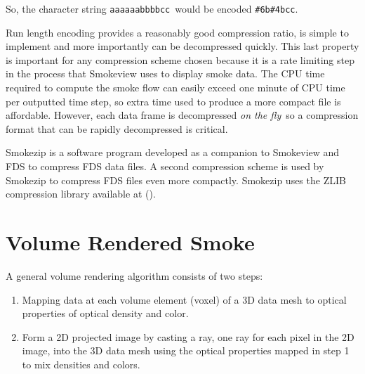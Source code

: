 So, the character string {\tt aaaaaabbbbcc}\ would be encoded {\tt \#6b\#4bcc}.

Run length encoding provides a reasonably good compression ratio,
is simple to implement and more importantly can be decompressed
quickly. This last property is important for any compression
scheme chosen because it is a rate limiting step in the process
that Smokeview uses to display smoke data. The CPU time required
to compute the smoke flow can easily exceed one minute of CPU time
per outputted time step, so extra time used to produce a more
compact file is affordable. However, each data frame is
decompressed {\em on the fly}\ so a compression format that can be
rapidly decompressed is critical.

Smokezip is a software program developed as a companion to
Smokeview and FDS to compress FDS data files. A second compression
scheme is used by Smokezip to compress FDS files even more
compactly.  Smokezip uses the ZLIB compression library available
at ().

%
%

\section{Volume Rendered Smoke}
A general volume rendering algorithm consists of two steps:

\begin{enumerate}
\item Mapping data at each volume element (voxel) of a 3D data
mesh to optical properties of optical density and color. \item
Form a 2D projected image by casting a ray, one ray for each pixel
in the 2D image, into the 3D data mesh using the optical
properties mapped in step 1 to mix densities and colors.
\end{enumerate}

